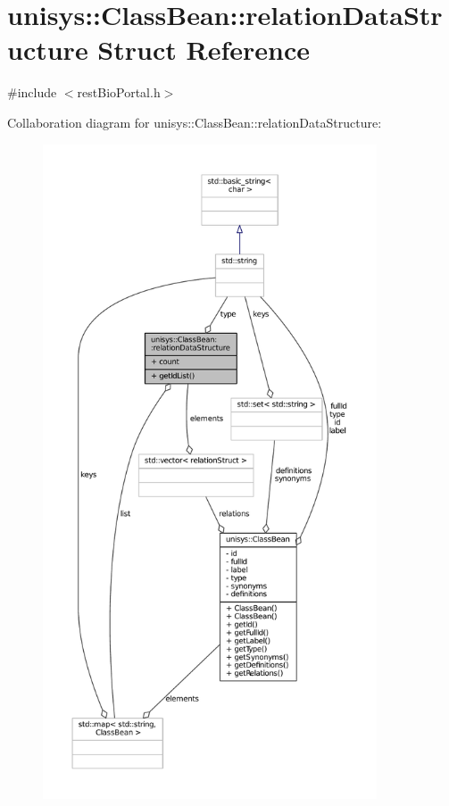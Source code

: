 \hypertarget{structunisys_1_1ClassBean_1_1relationDataStructure}{\section{unisys\-:\-:Class\-Bean\-:\-:relation\-Data\-Structure Struct Reference}
\label{structunisys_1_1ClassBean_1_1relationDataStructure}
}


{\ttfamily \#include $<$rest\-Bio\-Portal.\-h$>$}



Collaboration diagram for unisys\-:\-:Class\-Bean\-:\-:relation\-Data\-Structure\-:
\nopagebreak
\begin{figure}[H]
\begin{center}
\leavevmode
\includegraphics[height=550pt]{structunisys_1_1ClassBean_1_1relationDataStructure__coll__graph}
\end{center}
\end{figure}
